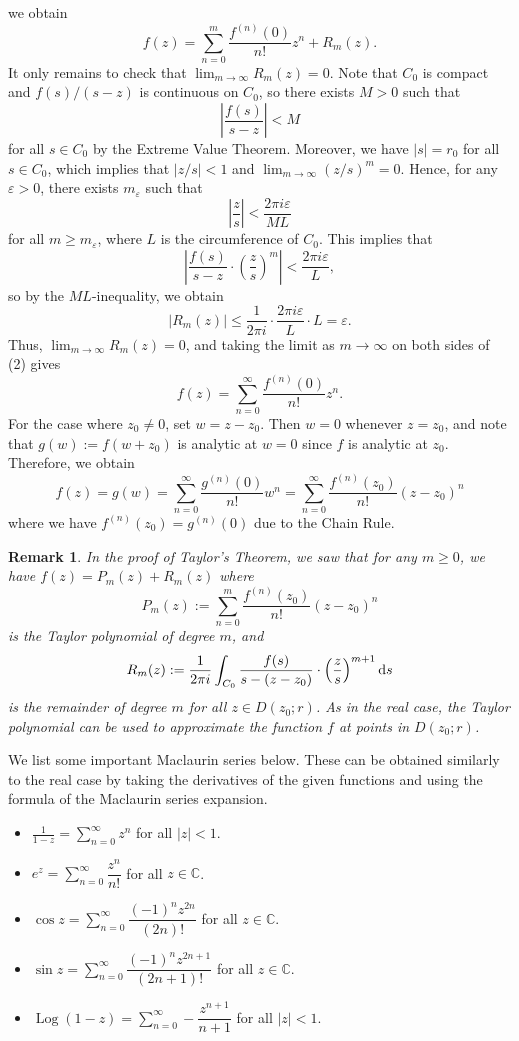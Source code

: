 \documentclass[10pt]{article}
\makeatletter
\newcommand{\eps}{\varepsilon}
\newcommand{\C}{\mathbb{C}}
\DeclareMathOperator{\Log}{Log}
\theoremstyle{newstyle}
\newtheorem{remark}[thm]{Remark}
\newenvironment{pf}[1][\proofname]{\par
  \pushQED{\qed}%
  \normalfont \topsep0\p@\relax
  \trivlist
  \item[\hskip\labelsep\scshape
  #1\@addpunct{.}]\ignorespaces
}{%
  \popQED\endtrivlist\@endpefalse
}
\makeatother
\begin{document}
\begin{pf}
we obtain 
\[ f(z) = \sum_{n=0}^m \frac{f^{(n)}(0)}{n!} z^n + R_m(z). \tag{2} \]
It only remains to check that $\lim_{m\to\infty} R_m(z) = 0$. Note that $C_0$ is 
compact and $f(s)/(s-z)$ is continuous on $C_0$, so there exists $M > 0$ such that 
\[ \left| \frac{f(s)}{s-z} \right| < M \]
for all $s \in C_0$ by the Extreme Value Theorem. Moreover, we have $|s| = r_0$ for all $s \in C_0$, 
which implies that $|z/s| < 1$ and $\lim_{m\to\infty} (z/s)^m = 0$. Hence, for any 
$\eps > 0$, there exists $m_{\eps}$ such that 
\[ \left| \frac zs \right| < \frac{2\pi i\eps}{ML} \]
for all $m \geq m_{\eps}$, where $L$ is the circumference of $C_0$. This implies that 
\[ \left| \frac{f(s)}{s-z} \cdot \left( \frac zs \right)^m \right| < \frac{2\pi i\eps}L, \]
so by the $ML$-inequality, we obtain 
\[ |R_m(z)| \leq \frac{1}{2\pi i} \cdot \frac{2\pi i\eps}L \cdot L = \eps. \]
Thus, $\lim_{m\to\infty} R_m(z) = 0$, and taking the limit as $m \to \infty$ on both sides of (2) gives 
\[ f(z) = \sum_{n=0}^\infty \frac{f^{(n)}(0)}{n!} z^n. \]
For the case where $z_0 \neq 0$, set $w = z-z_0$. Then $w = 0$ whenever $z = z_0$, and note that 
$g(w) := f(w+z_0)$ is analytic at $w=0$ since $f$ is analytic at $z_0$. Therefore, we obtain 
\[ f(z) = g(w) = \sum_{n=0}^\infty \frac{g^{(n)}(0)}{n!}w^n 
= \sum_{n=0}^\infty \frac{f^{(n)}(z_0)}{n!}(z-z_0)^n \]
where we have $f^{(n)}(z_0) = g^{(n)}(0)$ due to the Chain Rule. 
\end{pf}

\begin{remark}
In the proof of Taylor's Theorem, we saw that for any $m \geq 0$, we have 
$f(z) = P_m(z) + R_m(z)$ where 
\[ P_m(z) := \sum_{n=0}^m \frac{f^{(n)}(z_0)}{n!}(z-z_0)^n \]
is the Taylor polynomial of degree $m$, and 
\[ R_m(z) := \frac{1}{2\pi i} \int_{C_0} \frac{f(s)}{s-(z-z_0)} \cdot \left( \frac zs \right)^{m+1}
{\rm d}s \]
is the remainder of degree $m$ for all $z \in D(z_0; r)$. As in the real case, the Taylor 
polynomial can be used to approximate the function $f$ at points in $D(z_0; r)$. 
\end{remark}

We list some important Maclaurin series below. These can be obtained similarly to the real 
case by taking the derivatives of the given functions and using the formula of the 
Maclaurin series expansion. 
\begin{itemize}
    \item $\displaystyle\frac{1}{1-z} = \displaystyle\sum_{n=0}^\infty z^n$ for all $|z| < 1$. 
    \item $e^z = \displaystyle\sum_{n=0}^\infty \dfrac{z^n}{n!}$ for all $z \in \C$. 
    \item $\cos z = \displaystyle\sum_{n=0}^\infty \dfrac{(-1)^n z^{2n}}{(2n)!}$ for all $z \in \C$. 
    \item $\sin z = \displaystyle\sum_{n=0}^\infty \dfrac{(-1)^n z^{2n+1}}{(2n+1)!}$ for all $z \in \C$. 
    \item $\Log(1-z) = \displaystyle\sum_{n=0}^\infty -\dfrac{z^{n+1}}{n+1}$ for all $|z| < 1$. 
\end{itemize}
\end{document}
